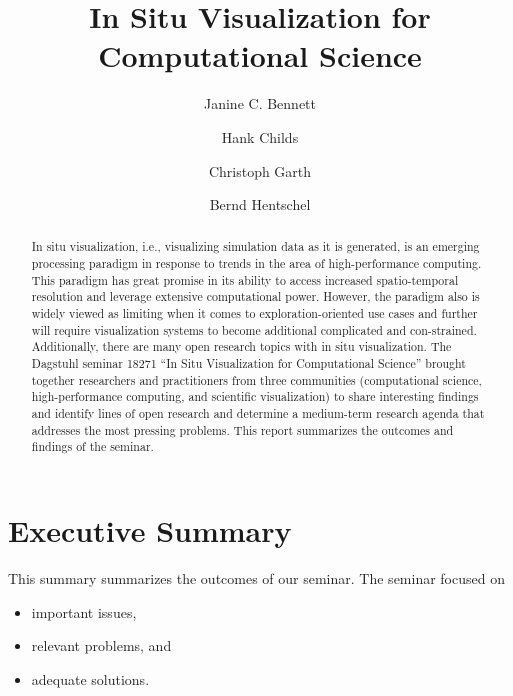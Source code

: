 \documentclass[a4paper,UKenglish]{dagrep}
\title{In Situ Visualization for Computational Science}
\author[1]{Janine C. Bennett}
\author[2]{Hank Childs}
\author[3]{Christoph Garth}
\author[4]{Bernd Hentschel}
\affil[1]{Sandia National Laboratories, Livermore}
\affil[2]{University of Oregon}
\affil[3]{Technische Universität Kaiserslautern}
\affil[4]{RWTH Aachen University}
\begin{document}
\maketitle

\begin{abstract}
In situ visualization, i.e., visualizing simulation data as it is generated, is an emerging processing paradigm in response to trends in the area of high-performance computing.  This paradigm has great promise in its ability to access increased spatio-temporal resolution and leverage extensive computational power.  However, the paradigm also is widely viewed as limiting when it comes to exploration-oriented use cases and further will require visualization systems to become additional complicated and con-strained.  Additionally, there are many open research topics with in situ visualization. The Dagstuhl seminar 18271 ``In Situ Visualization for Computational Science'' brought together researchers and practitioners from three communities (computational science, high-performance computing, and scientific visualization) to share interesting findings and identify lines of open research and determine a medium-term research agenda that addresses the most pressing problems. This report summarizes the outcomes and findings of the seminar.
\end{abstract}

\section{Executive Summary}

\license

This summary summarizes the outcomes of  our seminar. The seminar focused on\begin{itemize}
\item important issues,
\item relevant problems, and
\item adequate solutions.
\end{itemize}
\end{document}
